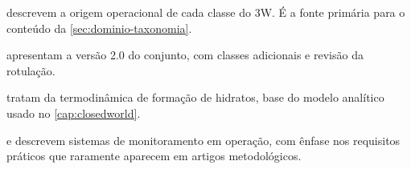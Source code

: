 \begin{leituras}
\item \citet{VARGAS2019} descrevem a origem operacional de cada classe do 3W. É a fonte
      primária para o conteúdo da \cref{sec:dominio-taxonomia}.
\item \citet{VazVargas2026_3w2} apresentam a versão 2.0 do conjunto, com classes
      adicionais e revisão da rotulação.
\item \citet{Safamirzaei2015} tratam da termodinâmica de formação de hidratos, base do
      modelo analítico usado no \cref{cap:closedworld}.
\item \citet{aranha2023system} e \citet{Aranha2024} descrevem sistemas de monitoramento
      em operação, com ênfase nos requisitos práticos que raramente aparecem em
      artigos metodológicos.
\end{leituras}
